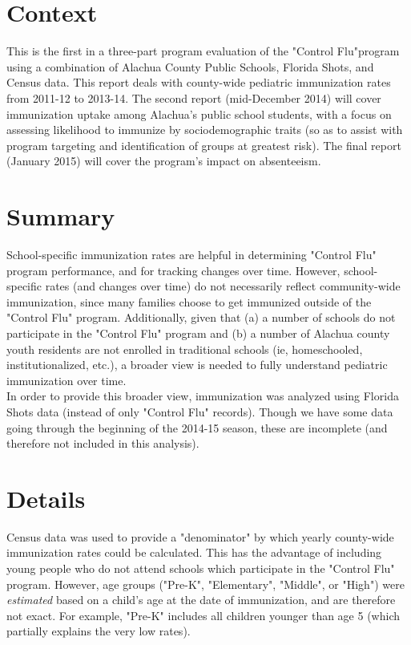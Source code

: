 \usepackage{Sweave}
 

\pagestyle{empty} %

\titleGP %




\section*{Context}
This is the first in a three-part program evaluation of the "Control Flu"program using a combination of Alachua County Public Schools, Florida Shots, and Census data.  This report deals with county-wide pediatric immunization rates from 2011-12 to 2013-14.  The second report (mid-December 2014) will cover immunization uptake among Alachua's public school students, with a focus on assessing likelihood to immunize by sociodemographic traits (so as to assist with program targeting and identification of groups at greatest risk).  The final report (January 2015) will cover the program's impact on absenteeism.  

\section*{Summary}
School-specific immunization rates are helpful in determining "Control Flu" program performance, and for tracking changes over time.  However, school-specific rates (and changes over time) do not necessarily reflect community-wide immunization, since many families choose to get immunized outside of the "Control Flu" program. Additionally, given that (a) a number of schools do not participate in the "Control Flu" program and (b) a number of Alachua county youth residents are not enrolled in traditional schools (ie, homeschooled, institutionalized, etc.), a broader view is needed to fully understand pediatric immunization over time. \\

In order to provide this broader view, immunization was analyzed using Florida Shots data (instead of only "Control Flu" records).   Though we have some data going through the beginning of the 2014-15 season, these are incomplete (and therefore not included in this analysis).

\section*{Details}
Census data was used to provide a "denominator" by which yearly county-wide immunization rates could be calculated. This has the advantage of including young people who do not attend schools which participate in the "Control Flu" program.  However, age groups ("Pre-K", "Elementary", "Middle", or "High") were \emph{estimated} based on a child's age at the date of immunization, and are therefore not exact. For example, "Pre-K" includes all children younger than age 5 (which partially explains the very low rates).

